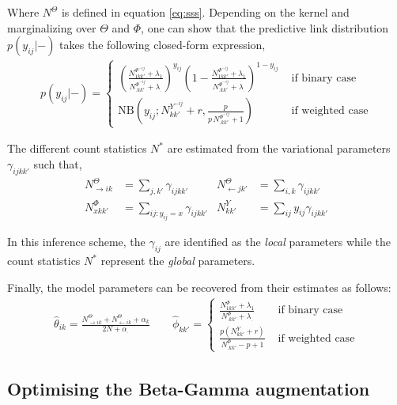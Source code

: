 Where $N^{\Theta}$ is defined in equation \eqref{eq:sss}.
Depending on the kernel and marginalizing over $\Theta$ and $\Phi$, one can show that the predictive link distribution $p(y_{ij}|-)$ takes the following closed-form expression,
\begin{align*}
p(y_{ij} |-)=\begin{cases}
    \left( \frac{ N^{\Phi^{-ij}}_{1 kk'} + \lambda_1}{N^{\Phi^{-ij}}_{\bm{.}kk'} + \lambda_{\bm{.}}}\right)^{y_{ij}} \left( 1- \frac{ N^{\Phi^{-ij}}_{1 kk'} + \lambda_1}{N^{\Phi^{-ij}}_{\bm{.}kk'} + \lambda_{\bm{.}}}\right)^{1-y_{ij}}  & \textrm{ if binary case} \\
    \mathrm{NB}\left(y_{ij}; N^{Y^{-ij}}_{kk'} + r, \frac{p}{p\,N^{\Phi^{-ij}}_{\bm{.}kk'} + 1} \right) & \textrm{ if weighted case} 
\end{cases}
\end{align*}

The different count statistics $N^*$ are estimated from the variational parameters $\gamma_{ijkk'}$ such that,
\begin{align} \label{eq:sss}
    N^{\Theta}_{\rightarrow ik} &= \sum_{j, k'} \gamma_{ijkk'}        & N^{\Theta}_{\leftarrow jk'} &= \sum_{i, k} \gamma_{ijkk'}  \nonumber \\
    N^{\Phi}_{xkk'} &= \sum_{ij:y_{ij}=x} \gamma_{ijkk'}  & N^{Y}_{kk'} &= \sum_{ij} y_{ij}\gamma_{ijkk'}
\end{align}

In this inference scheme, the $\gamma_{ij}$ are identified as the \emph{local} parameters while the count statistics $N^*$ represent the \emph{global} parameters.  

Finally, the model parameters can be recovered from their estimates as follows:
\begin{align*}
\hat \theta_{ik} = \frac{N^{\Theta}_{\rightarrow ik} + N^{\Theta}_{\leftarrow ik} + \alpha_k}{2N + \alpha_{\bm{.}}} \qquad 
\hat \phi_{kk'}=\begin{cases}
     \frac{N^{\Phi}_{1 kk'} + \lambda_1}{N^{\Phi}_{\bm{.}kk'} + \lambda_{\bm{.}}} & \textrm{ if binary case} \\
    \frac{p(N^Y_{kk'} + r)}{N^{\Phi}_{\bm{.}kk'} - p + 1}  & \textrm{ if weighted case} 
    \end{cases}
\end{align*}


\subsection{Optimising the Beta-Gamma augmentation}

